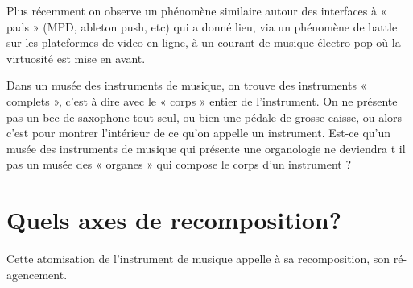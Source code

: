 Plus récemment on observe un phénomène similaire autour des interfaces à « pads » (MPD, ableton push, etc) qui a donné lieu, via un phénomène de battle sur les plateformes de video en ligne, à un courant de musique électro-pop où la virtuosité est mise en avant.

Dans un musée des instruments de musique, on trouve des instruments « complets », c’est à dire avec le « corps » entier de l’instrument. On ne présente pas un bec de saxophone tout seul, ou bien une pédale de grosse caisse, ou alors c’est pour montrer l’intérieur de ce qu’on appelle un instrument. Est-ce qu’un musée des instruments de musique qui présente une organologie ne deviendra t il pas un musée des « organes » qui compose le corps d’un instrument ?



\section{Quels axes de recomposition?}
\label{sec:introduction:axes}

Cette atomisation de l'instrument de musique appelle à sa recomposition, son ré-agencement. 